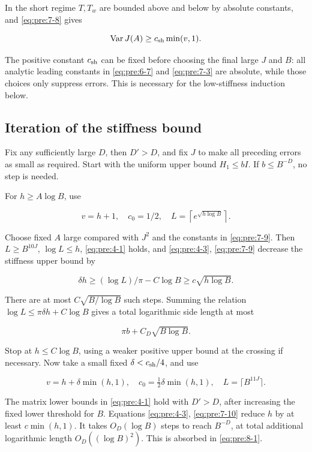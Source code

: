 In the short regime \(T,T_w\) are bounded above and below by absolute constants, and \eqref{eq:pre:7-8} gives

\begin{equation}
\operatorname{Var}J(A)\geq c_{\rm sh}\min(v,1).
\label{eq:pre:7-10}
\end{equation}

The positive constant \(c_{\rm sh}\) can be fixed before choosing the final large \(J\) and \(B\): all analytic leading constants in \eqref{eq:pre:6-7} and \eqref{eq:pre:7-3} are absolute, while those choices only suppress errors. This is necessary for the low-stiffness induction below.


\subsection{Iteration of the stiffness bound}\label{pre:iteration}

Fix any sufficiently large \(D\), then \(D'>D\), and fix \(J\) to make all preceding errors as small as required. Start with the uniform upper bound \(H_1\leq bI\). If \(b\leq B^{-D}\), no step is needed.

For \(h\geq A\log B\), use

\[
v=h+1,\quad c_0=1/2,\quad
L=\left\lceil e^{\sqrt{h\log B}}\right\rceil.
\]

Choose fixed \(A\) large compared with \(J^2\) and the constants in \eqref{eq:pre:7-9}. Then \(L\geq B^{10J}\), \(\log L\leq h\), \eqref{eq:pre:4-1} holds, and \eqref{eq:pre:4-3}, \eqref{eq:pre:7-9} decrease the stiffness upper bound by

\[
\delta h\geq(\log L)/\pi-C\log B
\geq c\sqrt{h\log B}.
\]

There are at most \(C\sqrt{B/\log B}\) such steps. Summing the relation \(\log L\leq\pi\delta h+C\log B\) gives a total logarithmic side length at most

\begin{equation}
\pi b+C_D\sqrt{B\log B}.
\label{eq:pre:8-1}
\end{equation}

Stop at \(h\leq C\log B\), using a weaker positive upper bound at the crossing if necessary. Now take a small fixed \(\delta<c_{\rm sh}/4\), and use

\[
v=h+\delta\min(h,1),\quad
c_0=\tfrac12\delta\min(h,1),\quad
L=\lceil B^{11J}\rceil.
\]

The matrix lower bounds in \eqref{eq:pre:4-1} hold with \(D'>D\), after increasing the fixed lower threshold for \(B\). Equations \eqref{eq:pre:4-3}, \eqref{eq:pre:7-10} reduce \(h\) by at least \(c\min(h,1)\). It takes \(O_D(\log B)\) steps to reach \(B^{-D}\), at total additional logarithmic length \(O_D((\log B)^2)\). This is absorbed in \eqref{eq:pre:8-1}.


